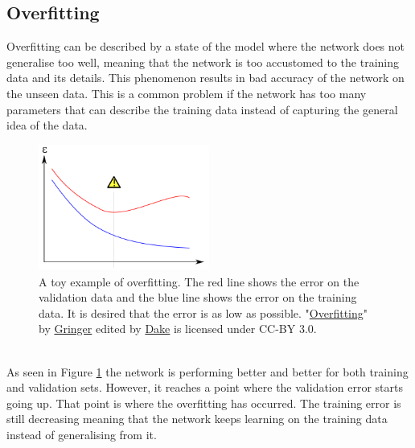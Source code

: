 \subsection{Overfitting}\label{sec:overfitting}
Overfitting can be described by a state of the model where the network does not generalise too well, meaning that the network is too accustomed to the training data and its details. This phenomenon results in bad accuracy of the network on the unseen data. This is a common problem if the network has too many parameters that can describe the training data instead of capturing the general idea of the data.
\begin{figure}[h]
    \centering
    \includegraphics[width=0.5\textwidth]{figure/ann/overfitting}
    \caption{A toy example of overfitting. The red line shows the error on the validation data and the blue line shows the error on the training data. It is desired that the error is as low as possible. 
    "\href{https://en.wikipedia.org/wiki/Overfitting\#/media/File:Overfitting_svg.svg}{Overfitting}" by
    \href{https://commons.wikimedia.org/wiki/User:Gringer}{Gringer} edited by
    \href{https://commons.wikimedia.org/wiki/User\:Dake}{Dake} is licensed under CC-BY 3.0.}
    \label{fig:overfitting}
\end{figure}
\\
As seen in Figure \ref{fig:overfitting} the network is performing better and better for both training and validation sets. However, it reaches a point where the validation error starts going up. That point is where the overfitting has occurred. The training error is still decreasing meaning that the network keeps learning on the training data instead of generalising from it. 

